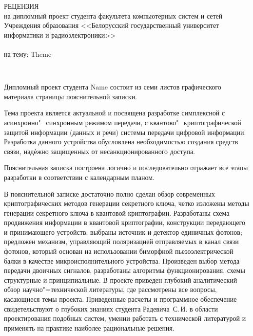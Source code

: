 \documentclass[]{lib/styles/additional-docs}
\begin{document}
\begin{singlespace}
  {\small
    \begin{center}
      \begin{minipage}{0.9\textwidth}
        \begin{center}
          {РЕЦЕНЗИЯ}\\[0.2cm]
          на дипломный проект студента факультета компьютерных систем и сетей Учреждения образования <<Белорусский государственный университет информатики и радиоэлектроники>>\\
          \me \\
          на тему: Theme 
        \end{center}
      \end{minipage}\\
    \end{center}
  
  Дипломный проект студента Name состоит из семи листов графического материала страницы пояснительной записки.
  
  Тема проекта является актуальной и посвящена разработке симплексной с асинхронно"=синхронным режимом передачи, с квантово"=криптографической защитой информации (данных и речи) системы передачи цифровой информации. 
  Разработка данного устройства обусловлена необходимостью создания средств связи, надѐжно защищенных от несанкционированного доступа.
  
  Пояснительная записка построена логично и последовательно отражает все этапы разработки в соответствии с календарным планом.
  
  В пояснительной записке достаточно полно сделан обзор современных криптографических методов генерации секретного ключа, четко изложены методы генерации секретного
  ключа в квантовой криптографии.
  Разработаны схема продвижения информации в квантовой криптографии, конструкции передающего и принимающего устройств; выбраны источник и детектор единичных фотонов; предложен механизм, управляющий поляризацией отправляемых в канал связи фотонов, который основан на использовании биморфной пьезоэлектрической балки в качестве микроисполнительного устройства. 
  Произведен выбор метода передачи двоичных сигналов, разработаны алгоритмы функционирования, схемы структурные и принципиальные.
  В проекте приведен глубокий аналитический обзор научно"=технической литературы, где рассмотрены все вопросы, касающиеся темы проекта.
  Приведенные расчеты и программное обеспечение свидетельствуют о глубоких знаниях студента Радевича~С.\,И. в области проектирования подобных систем, умении работать с технической литературой и применять на практике наиболее рациональные решения.
  
}
\end{singlespace}
\end{document}
